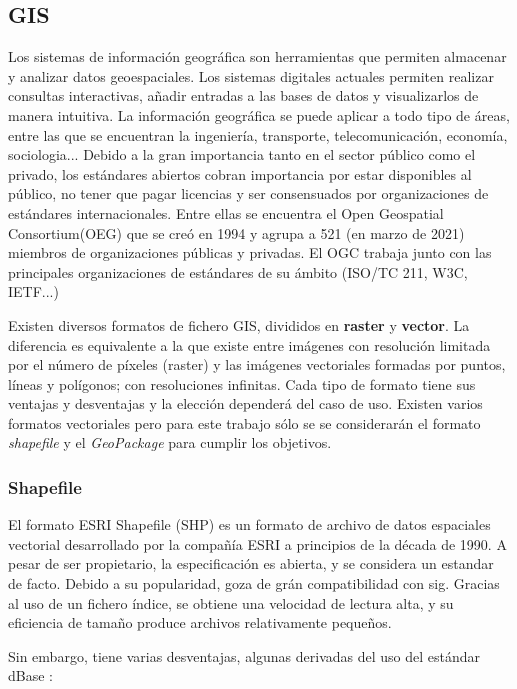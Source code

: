 \subsection{GIS} Los sistemas de información geográfica son herramientas que permiten almacenar y analizar datos
geoespaciales. Los sistemas digitales actuales permiten realizar consultas interactivas, añadir entradas a las
bases de datos y visualizarlos de manera intuitiva. La información geográfica se puede aplicar a todo tipo de
áreas, entre las que se encuentran la ingeniería, transporte, telecomunicación, economía, sociologia... Debido a
la gran importancia tanto en el sector público como el privado\cite{gis-standards}, los estándares abiertos
cobran importancia por estar disponibles al público, no tener que pagar licencias y ser consensuados por
organizaciones de estándares internacionales. Entre ellas se encuentra el Open Geospatial Consortium(OEG) que se creó
en 1994 y agrupa a 521 (en marzo de 2021) miembros de organizaciones públicas y privadas.\cite{ogc-members}
El OGC trabaja junto con las principales organizaciones de estándares de su ámbito (ISO/TC 211, W3C,
IETF...) \cite{ogc-whitepaper}

Existen diversos formatos de fichero GIS, divididos en \textbf{raster} y \textbf{vector}. La diferencia es
equivalente a la que existe entre imágenes con resolución limitada por el número de píxeles (raster) y las 
imágenes vectoriales formadas por puntos, líneas y polígonos; con resoluciones infinitas. Cada tipo de formato
tiene sus ventajas y desventajas y la elección dependerá del caso de uso. Existen varios formatos vectoriales
pero para este trabajo sólo se se considerarán el formato \textit{shapefile} y el \textit{GeoPackage} para cumplir
los objetivos.

\subsubsection{Shapefile} El formato ESRI Shapefile (SHP) es un formato de archivo de datos espaciales vectorial
desarrollado por la compañía ESRI a principios de la década de 1990. A pesar de ser propietario, la
especificación es abierta, y se considera un estandar de facto. Debido a su popularidad, goza de grán
compatibilidad con sig. Gracias al uso de un fichero índice, se obtiene una velocidad de lectura alta, y su
eficiencia de tamaño produce archivos relativamente pequeños.

Sin embargo, tiene varias desventajas, algunas derivadas del uso del estándar dBase \cite{shapefile-specs}
\cite{shapefile-no}: 

